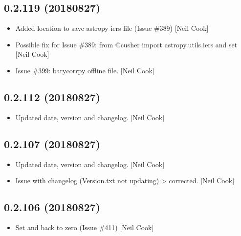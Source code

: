 \documentclass[a4paper,10pt,english]{report}
\begin{document}
\subsection{0.2.119 (2018\sphinxhyphen{}08\sphinxhyphen{}27)}
\label{\detokenize{misc/changelog:id369}}\begin{itemize}
\item {} 
Added location to save astropy iers file (Issue \#389) {[}Neil Cook{]}

\item {} 
Possible fix for Issue \#389: from @cusher \sphinxhyphen{} import
astropy.utils.iers and set  {[}Neil Cook{]}

\item {} 
Issue \#399: barycorrpy offline file. {[}Neil Cook{]}

\end{itemize}


\subsection{0.2.112 (2018\sphinxhyphen{}08\sphinxhyphen{}27)}
\label{\detokenize{misc/changelog:id370}}\begin{itemize}
\item {} 
Updated date, version and changelog. {[}Neil Cook{]}

\end{itemize}


\subsection{0.2.107 (2018\sphinxhyphen{}08\sphinxhyphen{}27)}
\label{\detokenize{misc/changelog:id371}}\begin{itemize}
\item {} 
Updated date, version and changelog. {[}Neil Cook{]}

\item {} 
Issue with changelog (Version.txt not updating) \textendash{}\textgreater{} corrected. {[}Neil
Cook{]}

\end{itemize}


\subsection{0.2.106 (2018\sphinxhyphen{}08\sphinxhyphen{}27)}
\label{\detokenize{misc/changelog:id372}}\begin{itemize}
\item {} 
Set  and  back to zero (Issue \#411)
{[}Neil Cook{]}

\end{itemize}
\end{document}
